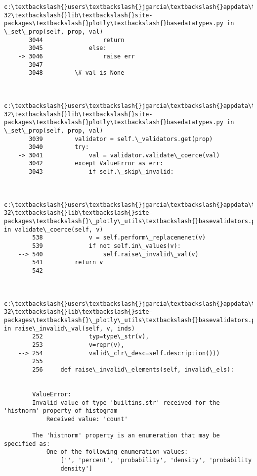 \documentclass[11pt]{article}
\begin{document}
\begin{Verbatim}[commandchars=\\\{\}]
        c:\textbackslash{}users\textbackslash{}jgarcia\textbackslash{}appdata\textbackslash{}local\textbackslash{}programs\textbackslash{}python\textbackslash{}python36-32\textbackslash{}lib\textbackslash{}site-packages\textbackslash{}plotly\textbackslash{}basedatatypes.py in \_set\_prop(self, prop, val)
       3044                 return
       3045             else:
    -> 3046                 raise err
       3047 
       3048         \# val is None
    

        c:\textbackslash{}users\textbackslash{}jgarcia\textbackslash{}appdata\textbackslash{}local\textbackslash{}programs\textbackslash{}python\textbackslash{}python36-32\textbackslash{}lib\textbackslash{}site-packages\textbackslash{}plotly\textbackslash{}basedatatypes.py in \_set\_prop(self, prop, val)
       3039         validator = self.\_validators.get(prop)
       3040         try:
    -> 3041             val = validator.validate\_coerce(val)
       3042         except ValueError as err:
       3043             if self.\_skip\_invalid:
    

        c:\textbackslash{}users\textbackslash{}jgarcia\textbackslash{}appdata\textbackslash{}local\textbackslash{}programs\textbackslash{}python\textbackslash{}python36-32\textbackslash{}lib\textbackslash{}site-packages\textbackslash{}\_plotly\_utils\textbackslash{}basevalidators.py in validate\_coerce(self, v)
        538             v = self.perform\_replacemenet(v)
        539             if not self.in\_values(v):
    --> 540                 self.raise\_invalid\_val(v)
        541         return v
        542 
    

        c:\textbackslash{}users\textbackslash{}jgarcia\textbackslash{}appdata\textbackslash{}local\textbackslash{}programs\textbackslash{}python\textbackslash{}python36-32\textbackslash{}lib\textbackslash{}site-packages\textbackslash{}\_plotly\_utils\textbackslash{}basevalidators.py in raise\_invalid\_val(self, v, inds)
        252             typ=type\_str(v),
        253             v=repr(v),
    --> 254             valid\_clr\_desc=self.description()))
        255 
        256     def raise\_invalid\_elements(self, invalid\_els):
    

        ValueError: 
        Invalid value of type 'builtins.str' received for the 'histnorm' property of histogram
            Received value: 'count'
    
        The 'histnorm' property is an enumeration that may be specified as:
          - One of the following enumeration values:
                ['', 'percent', 'probability', 'density', 'probability
                density']

    \end{Verbatim}
\end{document}
